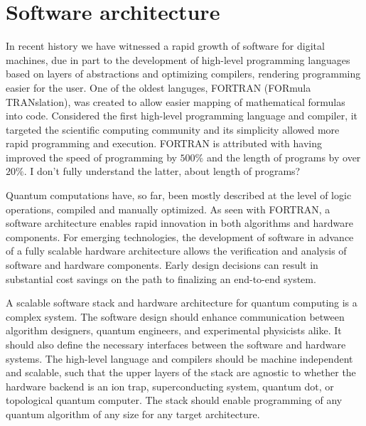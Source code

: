 \documentclass[journal]{IEEEtran}
\begin{document}
\section{Software architecture}


In recent history we have witnessed a rapid growth of software for digital machines, due in part to the development of high-level programming languages based on layers of abstractions and optimizing compilers, rendering programming easier for the user.
One of the oldest languges, FORTRAN \cite{} (FORmula TRANslation), was created to allow easier mapping of mathematical formulas into code.  Considered the first high-level programming language and compiler, it targeted the scientific computing community and its simplicity allowed more rapid programming and execution.  FORTRAN is attributed with having improved the speed of programming by $500\%$ and the length of programs by over $20\%$. {\color{red} I don't fully understand the latter, about length of programs?}

Quantum computations have, so far, been mostly described at the level of logic operations, compiled and manually optimized. 
As seen with FORTRAN, a software architecture enables rapid innovation in both algorithms and hardware components.
For emerging technologies, the development of software in advance of a fully scalable hardware architecture allows the verification and analysis of software and hardware components.  Early design decisions can result in substantial cost savings on the path to finalizing an end-to-end system.

A scalable software stack and hardware architecture for quantum computing is a complex system.
The software design should enhance communication between algorithm designers, quantum engineers, and experimental physicists alike.
It should also define the necessary interfaces between the software and hardware systems.
The high-level language and compilers should be machine independent and scalable, such that the upper layers of the stack are agnostic to whether the hardware backend is an ion trap, superconducting system, quantum dot, or topological quantum computer.
The stack should enable programming of any quantum algorithm of any size for any target architecture.
\end{document}
